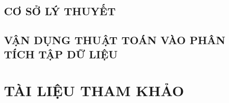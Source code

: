 \documentclass[a4paper,12pt,oneside]{report}
\title{\bf \TITLE}
\author{\AUTHOR}
\begin{document}
\restoregeometry

\pagestyle{empty} %
\newpage
{} %
\tableofcontents %
\newpage
\listoffigures %
\newpage
\listoftables %

\newpage
{}

\newpage
\pagestyle{fancy} %
\chapter{CƠ SỞ LÝ THUYẾT}


\chapter[ÁP DỤNG THUẬT TOÁN]{VẬN DỤNG THUẬT TOÁN VÀO PHÂN TÍCH TẬP DỮ LIỆU}


\part*{TÀI LIỆU THAM KHẢO}
\end{document}
